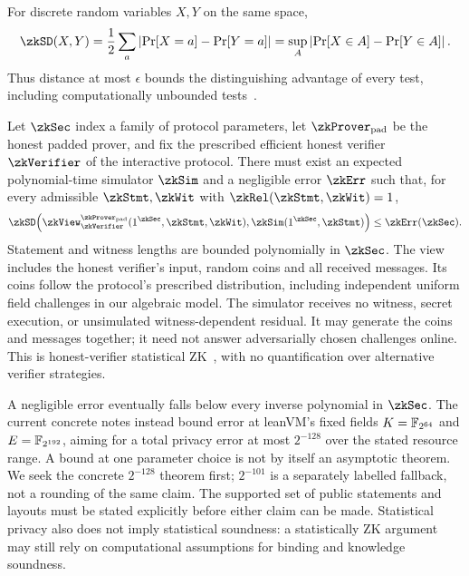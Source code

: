 \begin{definition}
For discrete random variables $X,Y$ on the same space,
\[
 \zkSD(X,Y)
 =\frac12\sum_a\left|\Pr[X=a]-\Pr[Y=a]\right|
 =\sup_A\left|\Pr[X\in A]-\Pr[Y\in A]\right|.
\]
Thus distance at most $\epsilon$ bounds the distinguishing advantage of every test, including computationally unbounded tests~\cite{distance}.
\end{definition}

\begin{definition}\label{def:zk-target}
Let $\zkSec$ index a family of protocol parameters, let $\zkProver_{\mathrm{pad}}$ be the honest padded prover, and fix the prescribed efficient honest verifier $\zkVerifier$ of the interactive protocol. There must exist an expected polynomial-time simulator $\zkSim$ and a negligible error $\zkErr$ such that, for every admissible $\zkStmt,\zkWit$ with $\zkRel(\zkStmt,\zkWit)=1$,
\[
 \zkSD\!\left(
 \zkView_{\zkVerifier}^{\zkProver_{\mathrm{pad}}}
      (1^{\zkSec},\zkStmt,\zkWit),
 \zkSim(1^{\zkSec},\zkStmt)
 \right)
 \le \zkErr(\zkSec).
\]
Statement and witness lengths are bounded polynomially in $\zkSec$. The view includes the honest verifier's input, random coins and all received messages. Its coins follow the protocol's prescribed distribution, including independent uniform field challenges in our algebraic model. The simulator receives no witness, secret execution, or unsimulated witness-dependent residual. It may generate the coins and messages together; it need not answer adversarially chosen challenges online. This is honest-verifier statistical ZK~\cite{zk-definition}, with no quantification over alternative verifier strategies.
\end{definition}

A negligible error eventually falls below every inverse polynomial in $\zkSec$. The current concrete notes instead bound error at leanVM's fixed fields $K=\mathbb{F}_{2^{64}}$ and $E=\mathbb{F}_{2^{192}}$, aiming for a total privacy error at most $2^{-128}$ over the stated resource range. A bound at one parameter choice is not by itself an asymptotic theorem. We seek the concrete $2^{-128}$ theorem first; $2^{-101}$ is a separately labelled fallback, not a rounding of the same claim. The supported set of public statements and layouts must be stated explicitly before either claim can be made. Statistical privacy also does not imply statistical soundness: a statistically ZK argument may still rely on computational assumptions for binding and knowledge soundness.

